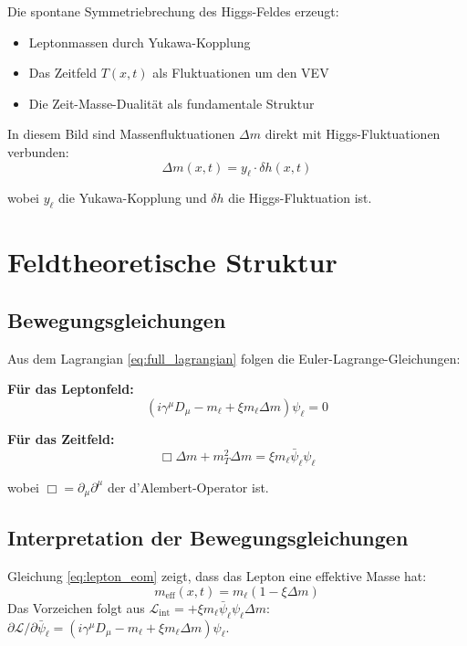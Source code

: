 	Die spontane Symmetriebrechung des Higgs-Feldes erzeugt:
	\begin{itemize}
		\item Leptonmassen durch Yukawa-Kopplung
		\item Das Zeitfeld $T(x,t)$ als Fluktuationen um den VEV
		\item Die Zeit-Masse-Dualität als fundamentale Struktur
	\end{itemize}
	
	In diesem Bild sind Massenfluktuationen $\Delta m$ direkt mit Higgs-Fluktuationen verbunden:
	\begin{equation}
		\Delta m(x,t) = y_\ell \cdot \delta h(x,t)
		\label{eq:higgs_fluctuation}
	\end{equation}
	
	wobei $y_\ell$ die Yukawa-Kopplung und $\delta h$ die Higgs-Fluktuation ist.
	
	\section{Feldtheoretische Struktur}
	
	\subsection{Bewegungsgleichungen}
	
	Aus dem Lagrangian \eqref{eq:full_lagrangian} folgen die Euler-Lagrange-Gleichungen:
	
	\textbf{Für das Leptonfeld:}
	\begin{equation}
		(i\gamma^\mu D_\mu - m_\ell + \xi m_\ell \Delta m)\psi_\ell = 0
		\label{eq:lepton_eom}
	\end{equation}
	
	\textbf{Für das Zeitfeld:}
	\begin{equation}
		\Box \Delta m + m_T^2 \Delta m = \xi m_\ell \bar{\psi}_\ell \psi_\ell
		\label{eq:time_field_eom}
	\end{equation}
	
	wobei $\Box = \partial_\mu \partial^\mu$ der d'Alembert-Operator ist.
	
	\subsection{Interpretation der Bewegungsgleichungen}
	
	Gleichung \eqref{eq:lepton_eom} zeigt, dass das Lepton eine effektive Masse hat:
	\begin{equation}
		m_{\text{eff}}(x,t) = m_\ell (1 - \xi \Delta m)
		\label{eq:effective_mass}
	\end{equation}
	Das Vorzeichen folgt aus $\mathcal{L}_{\text{int}} = +\xi m_\ell\bar\psi_\ell\psi_\ell\Delta m$: $\partial\mathcal{L}/\partial\bar\psi_\ell = (i\gamma^\mu D_\mu - m_\ell + \xi m_\ell\Delta m)\psi_\ell$.
	
